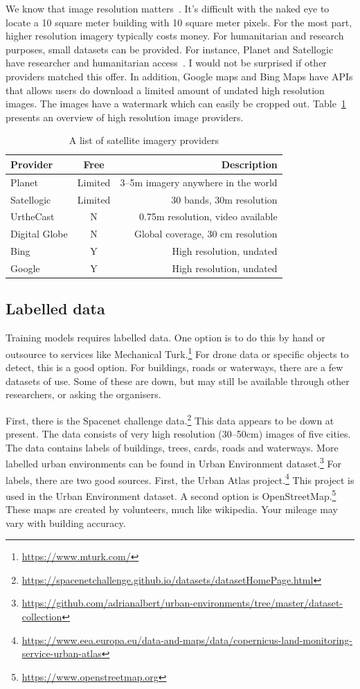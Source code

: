 \documentclass[12pt, a4paper, oneside, headinclude, footinclude]{article}
\begin{document}
We know that image resolution matters~\cite{2017The}. It's difficult with the
naked eye to locate a 10 square meter building with 10 square meter pixels.
For the most part, higher resolution imagery typically costs money. For
humanitarian and research purposes, small datasets can be provided. For
instance, Planet and Satellogic have researcher and humanitarian
access~\cite{Planet,Satellogic}. I would not be surprised if other providers
matched this offer. In addition, Google maps and Bing Maps have APIs that
allows users do download a limited amount of  undated high resolution images.
The images have a watermark which can easily be cropped out.
Table~\ref{tab:meinetabelle} presents an overview of high resolution image
providers.

\begin{table}[htb]
\caption{A list of satellite imagery providers}
\begin{tabular}{lcr}
Provider & Free & Description \\
\hline
    Planet & Limited & 3--5m imagery anywhere in the world \\
    Satellogic & Limited & 30 bands, 30m resolution \\
    UrtheCast & N & 0.75m resolution, video available \\    
    Digital Globe & N & Global coverage, 30 cm resolution \\ 
    Bing & Y & High resolution, undated \\
    Google & Y & High resolution, undated \\
\end{tabular} 
\label{tab:meinetabelle}
\end{table}

\subsection{Labelled data}

Training models requires labelled data. One option is to do this by hand or
outsource to services like Mechanical
Turk.\footnote{\url{https://www.mturk.com/}} For drone data or specific
objects to detect, this is a good option. For buildings, roads or waterways,
there are a few datasets of use. Some of these are down, but may still be
available through other researchers, or asking the organisers.

First, there is the Spacenet challenge
data.\footnote{\url{https://spacenetchallenge.github.io/datasets/datasetHomePage.html}}
This data appears to be down at present. The data consists of very high
resolution (30--50cm) images of five cities. The data contains labels of
buildings, trees, cards, roads and waterways. More labelled urban environments
can be found in Urban Environment
dataset.\footnote{\url{https://github.com/adrianalbert/urban-environments/tree/master/dataset-collection}}
For labels, there are two good sources. First, the Urban Atlas
project.\footnote{\url{https://www.eea.europa.eu/data-and-maps/data/copernicus-land-monitoring-service-urban-atlas}}
This project is used in the Urban Environment dataset. A second option is
OpenStreetMap.\footnote{\url{https://www.openstreetmap.org}} These maps are
created by volunteers, much like wikipedia. Your mileage may vary with
building accuracy. 
\end{document}
